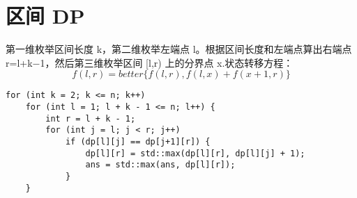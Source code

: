 \section{区间 DP}
第一维枚举区间长度 k，第二维枚举左端点 l。根据区间长度和左端点算出右端点 r=l+k−1，然后第三维枚举区间 [l,r) 上的分界点 x.状态转移方程：$$f(l, r) = better\{f(l, r), f(l, x) + f(x + 1, r)\}$$

\begin{verbatim}
for (int k = 2; k <= n; k++)
    for (int l = 1; l + k - 1 <= n; l++) {
        int r = l + k - 1;
        for (int j = l; j < r; j++)
            if (dp[l][j] == dp[j+1][r]) {
                dp[l][r] = std::max(dp[l][r], dp[l][j] + 1);
                ans = std::max(ans, dp[l][r]);
            }
    }
\end{verbatim}